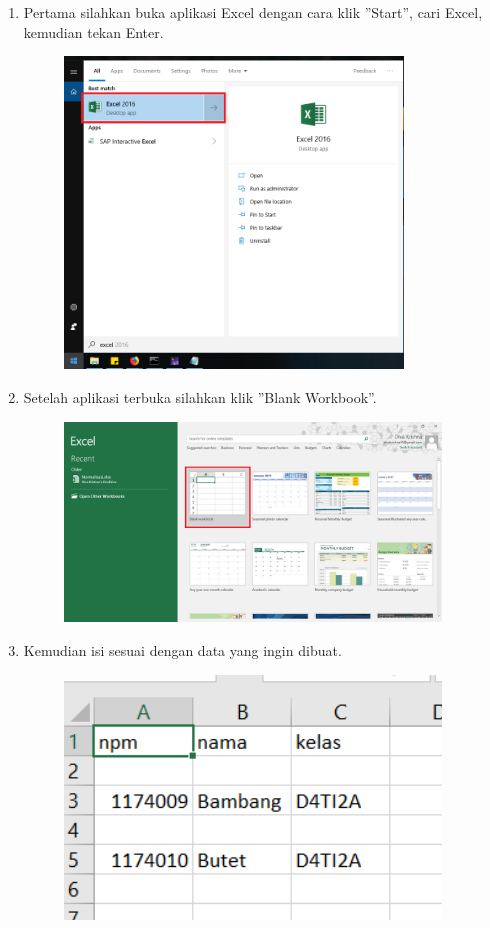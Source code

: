 \begin{enumerate}
	\item Pertama silahkan buka aplikasi Excel dengan cara klik ''Start'', cari Excel, kemudian tekan Enter.
	
	\begin{figure}[H]
		\includegraphics[width=9cm]{figures/4/1174026/Teori/t1.png}
		\centering
	\end{figure}
	
	\item Setelah aplikasi terbuka silahkan klik ''Blank Workbook''.
	
	\begin{figure}[H]
		\includegraphics[width=10cm]{figures/4/1174026/Teori/t2.png}
		\centering
	\end{figure}
	
	\item Kemudian isi sesuai dengan data yang ingin dibuat.
	
	\begin{figure}[H]
		\includegraphics[width=10cm]{figures/4/1174026/Teori/t3.png}
		\centering
	\end{figure}
	

\end{enumerate}
